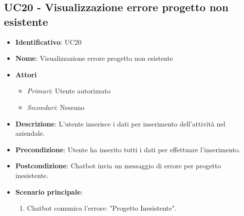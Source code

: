\subsection{UC20 - Visualizzazione errore progetto non esistente}
\begin{itemize}
	\item \textbf{Identificativo}: UC20
	\item \textbf{Nome}: Visualizzazione errore progetto non esistente
	\item \textbf{Attori}
	\begin{itemize} 
		\item \textit{Primari}: Utente autorizzato
		\item \textit{Secondari}: Nessuno
	\end{itemize}
	\item \textbf{Descrizione}: L'utente inserisce i dati per inserimento dell'attività nel  aziendale.
	\item \textbf{Precondizione}: Utente ha inserito tutti i dati per effettuare l'inserimento.
	\item \textbf{Postcondizione}: Chatbot invia un messaggio di errore per progetto inesistente.
	\item \textbf{Scenario principale}: \begin{enumerate}
		\item Chatbot comunica l'errore: "Progetto Inesistente".
	\end{enumerate}
\end{itemize}